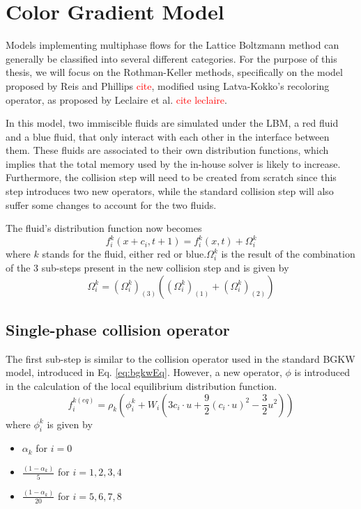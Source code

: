 \documentclass[12pt]{book}
\begin{document}
\section{Color Gradient Model}
Models implementing multiphase flows for the Lattice Boltzmann method can generally be classified into several different categories. For the purpose of this thesis, we will focus on the Rothman-Keller methods, specifically on the model proposed by Reis and Phillips \textcolor{red}{cite}, modified using Latva-Kokko's recoloring operator, as proposed by Leclaire et al. \textcolor{red}{cite leclaire}. \par
In this model, two immiscible fluids are simulated under the LBM, a red fluid and a blue fluid, that only interact with each other in the interface between them. These fluids are associated to their own distribution functions, which implies that the total memory used by the in-house solver is likely to increase. Furthermore, the collision step will need to be created from scratch since this step introduces two new operators, while the standard collision step will also suffer some changes to account for the two fluids. \par
The fluid's distribution function now becomes
\begin{equation}\label{eq:cgDistrib}
f_{i}^{k}\left(x+c_i, t+1\right) = f_{i}^{k}\left(x,t\right) + \Omega_i^{k}
\end{equation}
where $k$ stands for the fluid, either red or blue.$\Omega_i^{k}$ is the result of the combination of the 3 sub-steps present in the new collision step and is given by
\begin{equation}\label{eq:cgColl}
\Omega_i^{k} = \left(\Omega_i^{k}\right)_{\left(3\right)} \left(\left(\Omega_i^{k}\right)_{\left(1\right)} + \left(\Omega_i^{k}\right)_{\left(2\right)}\right)
\end{equation}
\subsection{Single-phase collision operator}
The first sub-step is similar to the collision operator used in the standard BGKW model, introduced in Eq. \ref{eq:bgkwEq}. However, a new operator, $\phi$ is introduced in the calculation of the local equilibrium distribution function. 
\begin{equation}\label{eq:newFEQ}
f_i^{k\left(eq\right)} = \rho_k\left(\phi_i^k + W_i\left(3c_i \cdot u + \frac{9}{2}\left(c_i \cdot u\right)^2 - \frac{3}{2}u^2 \right)\right)
\end{equation}
where $\phi_i^k$ is given by 
\begin{itemize}
	\item $\alpha_k$ for $i = 0$
	\item $\frac{\left(1-\alpha_k\right)}{5}$ for $i = {1,2,3,4}$
	\item $\frac{\left(1-\alpha_k\right)}{20}$ for $i = {5,6,7,8}$
\end{itemize}
\end{document}

